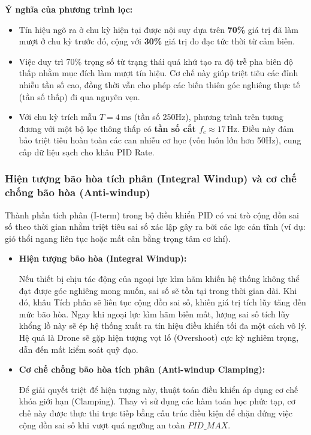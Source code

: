 \textbf{Ý nghĩa của phương trình lọc:}
\begin{itemize}
    \item Tín hiệu ngõ ra ở chu kỳ hiện tại được nội suy dựa trên \textbf{70\%} giá trị đã làm mượt ở chu kỳ trước đó, cộng với \textbf{30\%} giá trị đo đạc tức thời từ cảm biến.
    \item Việc duy trì 70\% trọng số từ trạng thái quá khứ tạo ra độ trễ pha biên độ thấp nhằm mục đích làm mượt tín hiệu. Cơ chế này giúp triệt tiêu các đỉnh nhiễu tần số cao, đồng thời vẫn cho phép các biến thiên góc nghiêng thực tế (tần số thấp) đi qua nguyên vẹn.
    \item Với chu kỳ trích mẫu $T = 4\,\text{ms}$ (tần số 250Hz), phương trình trên tương đương với một bộ lọc thông thấp có \textbf{tần số cắt $f_c \approx 17\,\text{Hz}$}. Điều này đảm bảo triệt tiêu hoàn toàn các can nhiễu cơ học (vốn luôn lớn hơn 50Hz), cung cấp dữ liệu sạch cho khâu PID Rate.
\end{itemize}

\subsubsection{Hiện tượng bão hòa tích phân (Integral Windup) và cơ chế chống bão hòa (Anti-windup)}

Thành phần tích phân (I-term) trong bộ điều khiển PID có vai trò cộng dồn sai số theo thời gian nhằm triệt tiêu sai số xác lập gây ra bởi các lực cản tĩnh (ví dụ: gió thổi ngang liên tục hoặc mất cân bằng trọng tâm cơ khí).

\begin{itemize}
    \item \textbf{Hiện tượng bão hòa (Integral Windup):}

    Nếu thiết bị chịu tác động của ngoại lực kìm hãm khiến hệ thống không thể đạt được góc nghiêng mong muốn, sai số sẽ tồn tại trong thời gian dài. Khi đó, khâu Tích phân sẽ liên tục cộng dồn sai số, khiến giá trị tích lũy tăng đến mức bão hòa. Ngay khi ngoại lực kìm hãm biến mất, lượng sai số tích lũy khổng lồ này sẽ ép hệ thống xuất ra tín hiệu điều khiển tối đa một cách vô lý. Hệ quả là Drone sẽ gặp hiện tượng vọt lố (Overshoot) cực kỳ nghiêm trọng, dẫn đến mất kiểm soát quỹ đạo.

    \item \textbf{Cơ chế chống bão hòa tích phân (Anti-windup Clamping):}

    Để giải quyết triệt để hiện tượng này, thuật toán điều khiển áp dụng cơ chế khóa giới hạn (Clamping). Thay vì sử dụng các hàm toán học phức tạp, cơ chế này được thực thi trực tiếp bằng cấu trúc điều kiện để chặn đứng việc cộng dồn sai số khi vượt quá ngưỡng an toàn $PID\_MAX$.
\end{itemize}

